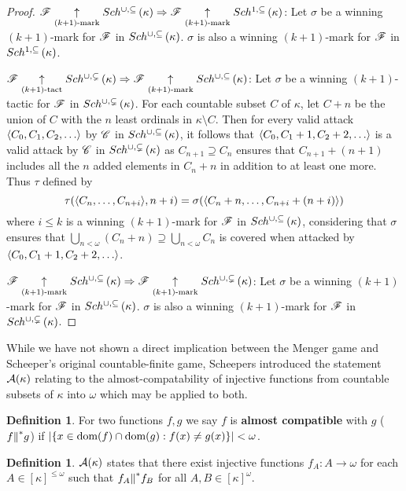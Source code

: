 \documentclass{amsart}
\theoremstyle{definition}
\newtheorem{definition}[theorem]{Definition}
\begin{document}
\begin{proof}
  \(\mathscr{F} \underset{(k+1)\text{-mark}}{\uparrow}Sch^{\cup,\subseteq}\left({\kappa}\right)
    \Rightarrow
  \mathscr{F} \underset{(k+1)\text{-mark}}{\uparrow}Sch^{1,\subseteq}\left({\kappa}\right)\):
  Let \(\sigma\) be a winning \((k+1)\)-mark for \(\mathscr{F}\) in
  \(Sch^{\cup,\subseteq}\left({\kappa}\right)\). \(\sigma\) is also a winning
  \((k+1)\)-mark for \(\mathscr{F}\)
  in \(Sch^{1,\subseteq}\left({\kappa}\right)\).

  \(\mathscr{F} \underset{(k+1)\text{-tact}}{\uparrow}Sch^{\cup,\subsetneq}\left({\kappa}\right)
    \Rightarrow
  \mathscr{F} \underset{(k+1)\text{-mark}}{\uparrow}Sch^{\cup,\subseteq}\left({\kappa}\right)\):
  Let \(\sigma\) be a winning \((k+1)\)-tactic for \(\mathscr{F}\) in
  \(Sch^{\cup,\subsetneq}\left({\kappa}\right)\). For each countable subset \(C\) of \(\kappa\), let \(C+n\)
  be the union of \(C\) with the \(n\) least ordinals in \(\kappa\setminus C\).
  Then for every valid attack \(\<C_0,C_1,C_2,\dots\>\) by \(\mathscr{C}\) in
  \(Sch^{\cup,\subseteq}\left({\kappa}\right)\), it follows that \(\<C_0,C_1+1,C_2+2,\dots\>\) is a
  valid attack by \(\mathscr{C}\) in \(Sch^{\cup,\subsetneq}\left({\kappa}\right)\) as
  \(C_{n+1}\supseteq C_n\) ensures that
  \(C_{n+1}+(n+1)\) includes all the \(n\) added elements in \(C_n+n\)
  in addition to at least one more.
  Thus \(\tau\) defined by
    \[
      \tau(\langle C_n,\dots,C_{n+i}\rangle,n+i)
        =
      \sigma(\langle C_n+n,\dots,C_{n+i}+(n+i)\rangle)
    \]
  where \(i\leq k\)
  is a winning \((k+1)\)-mark for \(\mathscr{F}\) in \(Sch^{\cup,\subseteq}\left({\kappa}\right)\),
  considering that \(\sigma\) ensures that
  \(\bigcup_{n<\omega}(C_n+n)\supseteq\bigcup_{n<\omega}C_n\)
  is covered when attacked by \(\<C_0,C_1+1,C_2+2,\dots\>\).

  \(\mathscr{F} \underset{(k+1)\text{-mark}}{\uparrow}Sch^{\cup,\subseteq}\left({\kappa}\right)
    \Rightarrow
  \mathscr{F} \underset{(k+1)\text{-mark}}{\uparrow}Sch^{\cup,\subsetneq}\left({\kappa}\right)\):
  Let \(\sigma\) be a winning \((k+1)\)-mark for \(\mathscr{F}\) in
  \(Sch^{\cup,\subseteq}\left({\kappa}\right)\). \(\sigma\) is also a winning
  \((k+1)\)-mark for \(\mathscr{F}\)
  in \(Sch^{\cup,\subsetneq}\left({\kappa}\right)\).
\end{proof}

While we have not shown a direct implication between the Menger game and
Scheeper's original countable-finite game, Scheepers introduced the statement
\(\mathcal{A}(\kappa)\) relating to the almost-compatability of injective functions
from countable subsets of \(\kappa\) into \(\omega\) which may be applied to
both.

\begin{definition}
  For two functions \(f,g\) we say \(f\) is \textbf{almost compatible} with
  \(g\) (\(f{\parallel}^* g\)) if \(|\{x\in\textrm{dom}(f)\cap\textrm{dom}(g):f(x)\not=g(x)\}|<\omega\).
\end{definition}

\begin{definition}
  \(\mathcal{A}(\kappa)\) states that there exist injective functions
  \(f_A:A\to\omega\) for each \(A\in[\kappa]^{\leq\omega}\) such that
  \(f_A{\parallel}^* f_B\) for all \(A,B\in[\kappa]^\omega\).
\end{definition}
\end{document}
